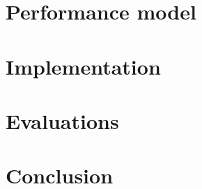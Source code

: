 \documentclass[preprint, 12pt]{elsarticle}
\begin{document}
\section{\mad}
\label{sec:forma_model}


\section{Performance model}
\label{sec:perf_model}


\section{Implementation}
\label{sec:implem}

\section{Evaluations}
\label{sec:evaluations}


\section{Conclusion}
\label{sec:conc}






%  

\end{document}
